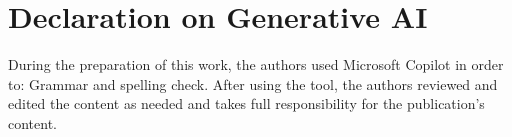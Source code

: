 \documentclass[
]{ceurart}
\theoremstyle{definition}
\begin{document}
\section*{Declaration on Generative AI}

  
\noindent During the preparation of this work, the authors used Microsoft Copilot in order to: Grammar and spelling check. After using the tool, the authors reviewed and edited the content as needed and takes full responsibility for the publication’s content. 



\end{document}
